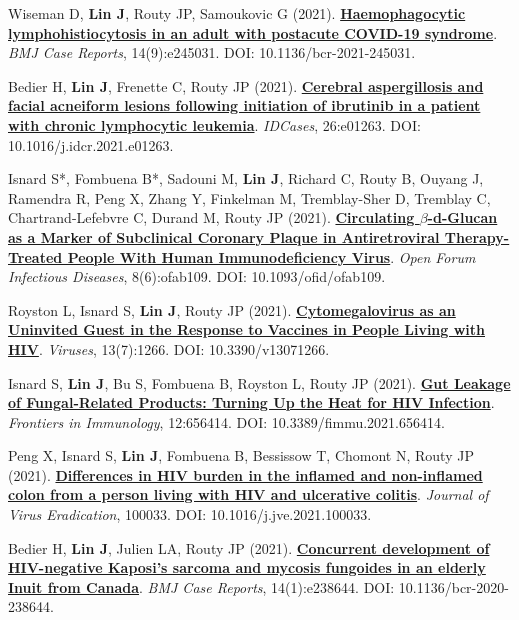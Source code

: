 \documentclass[letterpaper,11pt]{article}
\newcounter{journalCounter}
\newcommand{\jref}{%
    \stepcounter{journalCounter}%
    \textbf{[J.\thejournalCounter]}%
}
\begin{document}
\item[\jref] Wiseman D, \textbf{Lin J}, Routy JP, Samoukovic G (2021). \href{https://doi.org/10.1136/bcr-2021-245031}{\textbf{Haemophagocytic lymphohistiocytosis in an adult with postacute COVID-19 syndrome}}. \textit{BMJ Case Reports}, 14(9):e245031. DOI: 10.1136/bcr-2021-245031.

\item[\jref] Bedier H, \textbf{Lin J}, Frenette C, Routy JP (2021). \href{https://doi.org/10.1016/j.idcr.2021.e01263}{\textbf{Cerebral aspergillosis and facial acneiform lesions following initiation of ibrutinib in a patient with chronic lymphocytic leukemia}}. \textit{IDCases}, 26:e01263. DOI: 10.1016/j.idcr.2021.e01263.

\item[\jref] Isnard S*, Fombuena B*, Sadouni M, \textbf{Lin J}, Richard C, Routy B, Ouyang J, Ramendra R, Peng X, Zhang Y, Finkelman M, Tremblay-Sher D, Tremblay C, Chartrand-Lefebvre C, Durand M, Routy JP (2021). \href{https://doi.org/10.1093/ofid/ofab109}{\textbf{Circulating $\beta$-d-Glucan as a Marker of Subclinical Coronary Plaque in Antiretroviral Therapy-Treated People With Human Immunodeficiency Virus}}. \textit{Open Forum Infectious Diseases}, 8(6):ofab109. DOI: 10.1093/ofid/ofab109.

\item[\jref] Royston L, Isnard S, \textbf{Lin J}, Routy JP (2021). \href{https://doi.org/10.3390/v13071266}{\textbf{Cytomegalovirus as an Uninvited Guest in the Response to Vaccines in People Living with HIV}}. \textit{Viruses}, 13(7):1266. DOI: 10.3390/v13071266.

\item[\jref] Isnard S, \textbf{Lin J}, Bu S, Fombuena B, Royston L, Routy JP (2021). \href{https://doi.org/10.3389/fimmu.2021.656414}{\textbf{Gut Leakage of Fungal‐Related Products: Turning Up the Heat for HIV Infection}}. \textit{Frontiers in Immunology}, 12:656414. DOI: 10.3389/fimmu.2021.656414.

\item[\jref] Peng X, Isnard S, \textbf{Lin J}, Fombuena B, Bessissow T, Chomont N, Routy JP (2021). \href{https://doi.org/10.1016/j.jve.2021.100033}{\textbf{Differences in HIV burden in the inflamed and non-inflamed colon from a person living with HIV and ulcerative colitis}}. \textit{Journal of Virus Eradication}, 100033. DOI: 10.1016/j.jve.2021.100033.

\item[\jref] Bedier H, \textbf{Lin J}, Julien LA, Routy JP (2021). \href{https://doi.org/10.1136/bcr-2020-238644}{\textbf{Concurrent development of HIV-negative Kaposi’s sarcoma and mycosis fungoides in an elderly Inuit from Canada}}. \textit{BMJ Case Reports}, 14(1):e238644. DOI: 10.1136/bcr-2020-238644.
\end{document}
